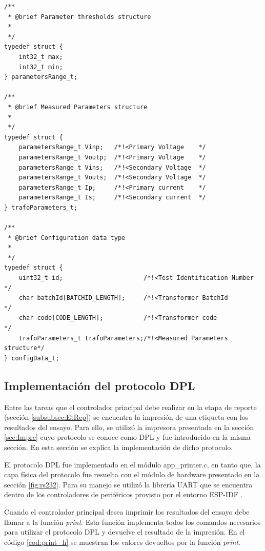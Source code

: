 \begin{lstlisting}[label=cod:struct_http,caption=Estructuras para el manejo de los datos recibidos.]
/**
 * @brief Parameter thresholds structure
 *
 */
typedef struct {
	int32_t max;
	int32_t min;
} parametersRange_t;

/**
 * @brief Measured Parameters structure
 *
 */
typedef struct {
	parametersRange_t Vinp;   /*!<Primary Voltage    */
	parametersRange_t Voutp;  /*!<Primary Voltage    */
	parametersRange_t Vins;   /*!<Secondary Voltage  */
	parametersRange_t Vouts;  /*!<Secondary Voltage  */
	parametersRange_t Ip;     /*!<Primary current    */
	parametersRange_t Is;     /*!<Secondary current  */
} trafoParameters_t;

/**
 * @brief Configuration data type
 *
 */
typedef struct {
	uint32_t id;                      /*!<Test Identification Number   */
	char batchId[BATCHID_LENGTH];     /*!<Transformer BatchId          */
	char code[CODE_LENGTH];           /*!<Transformer code             */
	trafoParameters_t trafoParameters;/*!<Measured Parameters structure*/
} configData_t;
\end{lstlisting}


\subsection{Implementación del protocolo DPL}

Entre las tareas que el controlador principal debe realizar en la etapa de reporte (sección \ref{subsubsec:EtRep}) se encuentra la impresión de una etiqueta con los resultados del ensayo. Para ello, se utilizó la impresora presentada en la sección \ref{sec:Impre} cuyo protocolo se conoce como DPL y fue introducido en la misma sección. En esta sección se explica la implementación de dicho protocolo.

El protocolo DPL fue implementado en el módulo app\_printer.c, en tanto que, la capa física del protocolo fue resuelta con el módulo de hardware presentado en la sección \ref{fig:rs232}. Para su manejo se utilizó la librería UART que se encuentra dentro de los controladores de periféricos provisto por el entorno ESP-IDF \citep{ESPIDF:PER}.

Cuando el controlador principal desea imprimir los resultados del ensayo debe llamar a la función \textit{print}. Esta función implementa todos los comandos necesarios para utilizar el protocolo DPL y devuelve el resultado de la impresión. En el código \ref{cod:print_h} se muestran los valores devueltos por la función \textit{print}.

